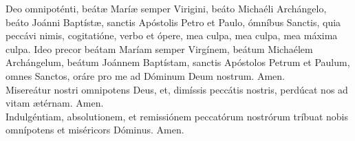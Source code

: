 Deo omnipoténti, beát{\ae} Marí{\ae} semper Virigini, beáto Michaéli Archángelo, beáto Joánni Baptíst{\ae}, sanctis 
Apóstolis Petro et Paulo, ómníbus Sanctis, quia peccávi nimis, cogitatióne, verbo et ópere, mea culpa, mea culpa, mea máxima culpa. Ideo precor beátam
Maríam semper Virgínem, beátum Michaélem Archángelum, beátum Joánnem Baptístam, sanctis Apóstolos Petrum et Paulum, omnes Sanctos,
oráre pro me ad Dóminum Deum nostrum. Amen.\\
Misereátur nostri omnipotens Deus, et, dimíssis peccátis nostris, perdúcat nos ad vitam {\ae}térnam. Amen.\\
Indulgéntiam, absolutionem, et remissiónem peccatórum nostrórum tríbuat nobis omnípotens et miséricors Dóminus. Amen.